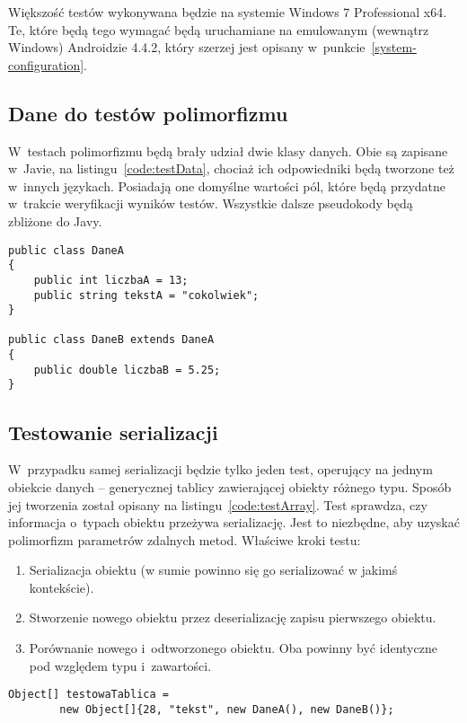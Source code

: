 Większość testów wykonywana będzie na systemie Windows 7 Professional x64.
Te, które będą tego wymagać będą uruchamiane na emulowanym (wewnątrz Windows) Androidzie 4.4.2, który szerzej jest opisany w~punkcie~\ref{system-configuration}.


\subsection{Dane do testów polimorfizmu}
W~testach polimorfizmu będą brały udział dwie klasy danych. Obie są zapisane w~Javie, na listingu~\ref{code:testData}, chociaż ich odpowiedniki będą tworzone też w~innych językach. Posiadają one domyślne wartości pól, które będą przydatne w~trakcie weryfikacji wyników testów. Wszystkie dalsze pseudokody będą zbliżone do Javy.

\begin{lstlisting}[float, frame=single, caption={Testowe klasy danych; jedna dziedzicząca drugą.}, label=code:testData]
public class DaneA
{
	public int liczbaA = 13;
	public string tekstA = "cokolwiek";
}

public class DaneB extends DaneA
{
	public double liczbaB = 5.25;
}
\end{lstlisting}


\subsection{Testowanie serializacji}
W~przypadku samej serializacji będzie tylko jeden test, operujący na jednym obiekcie danych -- generycznej tablicy zawierającej obiekty różnego typu.
Sposób jej tworzenia został opisany na listingu~\ref{code:testArray}.
Test sprawdza, czy informacja o~typach obiektu przeżywa serializację.
Jest to niezbędne, aby uzyskać polimorfizm parametrów zdalnych metod.
Właściwe kroki testu:
\begin{enumerate}
	\item Serializacja obiektu (w sumie powinno się go serializować w jakimś kontekście).
	\item Stworzenie nowego obiektu przez deserializację zapisu pierwszego obiektu.
	\item Porównanie nowego i~odtworzonego obiektu. Oba powinny być identyczne pod względem typu i~zawartości.
\end{enumerate}

\begin{lstlisting}[frame=single, caption={Tablica obiektów różnych typów służąca do sprawdzenia, czy informacja o~typie zostaje zachowana.}, label=code:testArray]
Object[] testowaTablica =
		new Object[]{28, "tekst", new DaneA(), new DaneB()};
\end{lstlisting}

